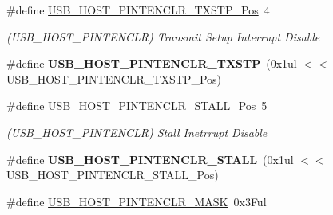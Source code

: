 \begin{DoxyCompactItemize}
\item 
\hypertarget{group___s_a_m_l21___u_s_b_ga28780c1d24c1c2a6b166a6de31426276}{}\#define \hyperlink{group___s_a_m_l21___u_s_b_ga28780c1d24c1c2a6b166a6de31426276}{U\+S\+B\+\_\+\+H\+O\+S\+T\+\_\+\+P\+I\+N\+T\+E\+N\+C\+L\+R\+\_\+\+T\+X\+S\+T\+P\+\_\+\+Pos}~4\label{group___s_a_m_l21___u_s_b_ga28780c1d24c1c2a6b166a6de31426276}

\begin{DoxyCompactList}\small\item\em (U\+S\+B\+\_\+\+H\+O\+S\+T\+\_\+\+P\+I\+N\+T\+E\+N\+C\+L\+R) Transmit Setup Interrupt Disable \end{DoxyCompactList}\item 
\hypertarget{group___s_a_m_l21___u_s_b_ga0a0166c5c0f9335e3aedf699d5dc8054}{}\#define {\bfseries U\+S\+B\+\_\+\+H\+O\+S\+T\+\_\+\+P\+I\+N\+T\+E\+N\+C\+L\+R\+\_\+\+T\+X\+S\+T\+P}~(0x1ul $<$$<$ U\+S\+B\+\_\+\+H\+O\+S\+T\+\_\+\+P\+I\+N\+T\+E\+N\+C\+L\+R\+\_\+\+T\+X\+S\+T\+P\+\_\+\+Pos)\label{group___s_a_m_l21___u_s_b_ga0a0166c5c0f9335e3aedf699d5dc8054}

\item 
\hypertarget{group___s_a_m_l21___u_s_b_gab840aa848520c29b62d489d312b02e48}{}\#define \hyperlink{group___s_a_m_l21___u_s_b_gab840aa848520c29b62d489d312b02e48}{U\+S\+B\+\_\+\+H\+O\+S\+T\+\_\+\+P\+I\+N\+T\+E\+N\+C\+L\+R\+\_\+\+S\+T\+A\+L\+L\+\_\+\+Pos}~5\label{group___s_a_m_l21___u_s_b_gab840aa848520c29b62d489d312b02e48}

\begin{DoxyCompactList}\small\item\em (U\+S\+B\+\_\+\+H\+O\+S\+T\+\_\+\+P\+I\+N\+T\+E\+N\+C\+L\+R) Stall Inetrrupt Disable \end{DoxyCompactList}\item 
\hypertarget{group___s_a_m_l21___u_s_b_gaa01aa811ced28d68f50c531370de549d}{}\#define {\bfseries U\+S\+B\+\_\+\+H\+O\+S\+T\+\_\+\+P\+I\+N\+T\+E\+N\+C\+L\+R\+\_\+\+S\+T\+A\+L\+L}~(0x1ul $<$$<$ U\+S\+B\+\_\+\+H\+O\+S\+T\+\_\+\+P\+I\+N\+T\+E\+N\+C\+L\+R\+\_\+\+S\+T\+A\+L\+L\+\_\+\+Pos)\label{group___s_a_m_l21___u_s_b_gaa01aa811ced28d68f50c531370de549d}

\item 
\hypertarget{group___s_a_m_l21___u_s_b_ga3335d306982defff68936f6beb48096f}{}\#define \hyperlink{group___s_a_m_l21___u_s_b_ga3335d306982defff68936f6beb48096f}{U\+S\+B\+\_\+\+H\+O\+S\+T\+\_\+\+P\+I\+N\+T\+E\+N\+C\+L\+R\+\_\+\+M\+A\+S\+K}~0x3\+Ful\label{group___s_a_m_l21___u_s_b_ga3335d306982defff68936f6beb48096f}


\end{DoxyCompactItemize}
